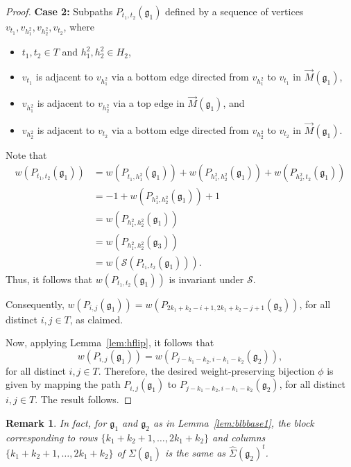 \documentclass[letterpaper,10pt]{article}
\newtheorem{remark}[theorem]{Remark}
\begin{document}
\begin{proof}
\noindent
\textbf{Case 2:} Subpaths $P_{t_1,t_2}(\mathfrak{g}_1)$ defined by a sequence of vertices $v_{t_1},v_{h_1^2},v_{h_2^2},v_{t_2}$, where
\begin{itemize}
    \item $t_1,t_2\in T$ and $h_1^2,h_2^2\in H_2$,
    \item $v_{t_1}$ is adjacent to $v_{h_1^2}$ via a bottom edge directed from $v_{h_1^2}$ to $v_{t_1}$ in $\overrightarrow{M}(\mathfrak{g}_1)$,
    \item $v_{h_1^2}$ is adjacent to $v_{h_2^2}$ via a top edge in $\overrightarrow{M}(\mathfrak{g}_1)$, and
    \item $v_{h_2^2}$ is adjacent to $v_{t_2}$ via a bottom edge directed from $v_{h_2^2}$ to $v_{t_2}$ in $\overrightarrow{M}(\mathfrak{g}_1)$.
\end{itemize}
Note that 
\begin{align*}
    w(P_{t_1,t_2}(\mathfrak{g}_1))&=w(P_{t_1,h_1^2}(\mathfrak{g}_1))+w(P_{h^2_1,h^2_2}(\mathfrak{g}_1))+w(P_{h^2_2,t_2}(\mathfrak{g}_1))\\
    &=-1+w(P_{h^2_1,h^2_2}(\mathfrak{g}_1))+1\\
    &=w(P_{h^2_1,h^2_2}(\mathfrak{g}_1))\\
    &=w(P_{h^2_1,h^2_2}(\mathfrak{g}_3))\\
    &=w(\mathcal{S}(P_{t_1,t_2}(\mathfrak{g}_1))).
\end{align*}
Thus, it follows that $w(P_{t_1,t_2}(\mathfrak{g}_1))$ is invariant under $\mathcal{S}$. 
\bigskip

\noindent
Consequently, $w(P_{i,j}(\mathfrak{g}_1))=w(P_{2k_1+k_2-i+1,2k_1+k_2-j+1}(\mathfrak{g}_3))$, for all distinct $i,j\in T$, as claimed. 

Now, applying Lemma~\ref{lem:hflip}, it follows that $$w(P_{i,j}(\mathfrak{g}_1))=w(P_{j-k_1-k_2,i-k_1-k_2}(\mathfrak{g}_2)),$$ for all distinct $i,j\in T$. Therefore, the desired weight-preserving bijection $\phi$ is given by mapping the path $P_{i,j}(\mathfrak{g}_1)$ to $P_{j-k_1-k_2,i-k_1-k_2}(\mathfrak{g}_2)$, for all distinct $i,j\in T.$ The result follows.
\end{proof}

\begin{remark}
In fact, for $\mathfrak{g}_1$ and $\mathfrak{g}_2$ as in Lemma~\ref{lem:blbbase1}, the block corresponding to rows $\{k_1+k_2+1,\hdots,2k_1+k_2\}$ and columns $\{k_1+k_2+1,\hdots,2k_1+k_2\}$ of $\Sigma(\mathfrak{g}_1)$ is the same as $\widehat{\Sigma}(\mathfrak{g}_2)^t$.
\end{remark}
\end{document}
